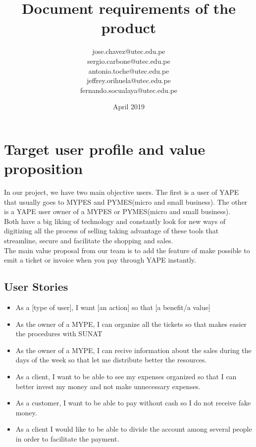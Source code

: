 \documentclass{article}
\title{Document requirements of the product}
\author{jose.chavez@utec.edu.pe \\ sergio.carbone@utec.edu.pe\\antonio.toche@utec.edu.pe\\jeffrey.orihuela@utec.edu.pe\\fernando.socualaya@utec.edu.pe}
\date{April 2019}
\begin{document}
\maketitle

\section{Target user profile and value proposition}
   In our project, we have two main objective users. The first is a user of YAPE that usually goes to MYPES and PYMES(micro and small business). The other is a YAPE user owner of a MYPES or PYMES(micro and small business).\\ Both have a big liking of technology and constantly look for new ways of digitizing all the process of selling taking advantage of these tools that streamline, secure and facilitate the shopping and sales.\\
   The main value proposal from our team is to add the feature of make possible to emit a ticket or invoice when you pay through YAPE instantly.
    \subsection{User Stories} 
    \begin{itemize}
    \item As a [type of user], I want [an action] so that [a benefit/a value]
    \item As the owner of a MYPE, I can organize all the tickets so that makes easier the procedures with SUNAT
    \item As the owner of a MYPE, I can recive information about the sales during the days of the week so that let me distribute better the resources.
    \item As a client, I want to be able to see my expenses organized so that I can better invest my money and not make unnecessary expenses.
    \item As a customer, I want to be able to pay without cash so I do not receive fake money.
    \item As a client I would like to be able to divide the account among several people in order to facilitate the payment.


    \end{itemize}
    
\end{document}

